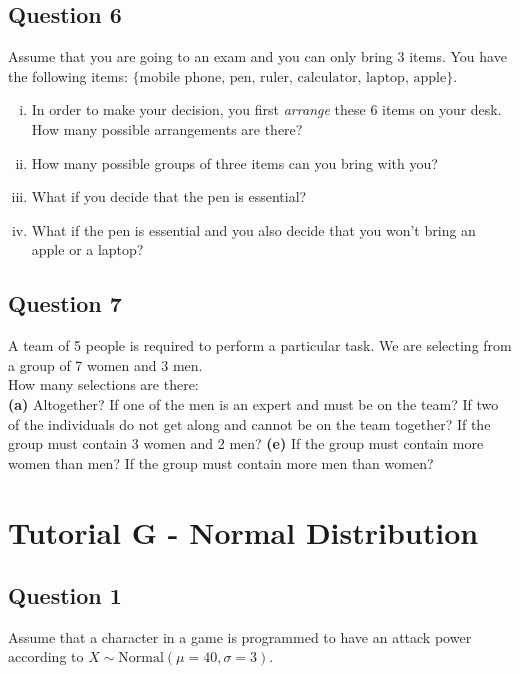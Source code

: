 

\subsection*{Question 6}
Assume that you are going to an exam and you can only bring 3 items. You have the following items: $\{\text{mobile phone, } \text{pen, } \text{ruler, } \text{calculator, } \text{laptop, } \text{apple} \}$.\\[-0.2cm]

\begin{enumerate}[(i)]
\item In order to make your decision, you first \emph{arrange} these 6 items on your desk. How many possible arrangements are there? \item How many possible groups of three items can you bring with you? \item What if you decide that the pen is essential? \item What if the pen is essential and you also decide that you won't bring an apple or a laptop?
\end{enumerate}


\subsection*{Question 7}
A team of 5 people is required to perform a particular task. We are selecting from a group of 7 women and 3 men.\\[0.2cm]
How many selections are there:\\[-0.2cm]

{\bf(a)} Altogether?  If one of the men is an expert and must be on the team?  If two of the individuals do not get along and cannot be on the team together?  If the group must contain 3 women and 2 men? {\bf(e)} If the group must contain more women than men?  If the group must contain more men than women?


\section{Tutorial G - Normal Distribution}
\subsection*{Question 1}
Assume that a character in a game is programmed to have an attack power according to $X \sim \text{Normal}(\mu=40,\sigma=3)$.\\[-0.2cm]


